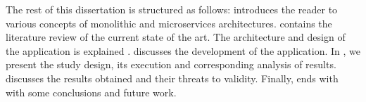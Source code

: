 The rest of this dissertation is structured as follows: 
introduces the reader to various concepts of monolithic and microservices
architectures.  contains the literature review of the current
state of the art. The architecture and design of the application is explained
.  discusses the
development of the application. In , we present
the study design, its execution and corresponding analysis of results.
 discusses the results obtained and their threats to
validity. Finally,  ends with with some conclusions and
future work.
